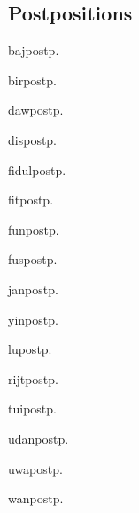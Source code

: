 \begin{multicols*}{2}
\section{Postpositions}

\begin{description}[leftmargin=*]
    \begin{dictentry}{baj}{postp.}
    \end{dictentry}
    \begin{dictentry}{bir}{postp.}
    \end{dictentry}
    \begin{dictentry}{daw}{postp.}
    \end{dictentry}
    \begin{dictentry}{dis}{postp.}
    \end{dictentry}
    \begin{dictentry}{fidul}{postp.}
    \end{dictentry}
    \begin{dictentry}{fit}{postp.}
    \end{dictentry}
    \begin{dictentry}{fun}{postp.}
    \end{dictentry}
    \begin{dictentry}{fus}{postp.}
    \end{dictentry}
    \begin{dictentry}{jan}{postp.}
    \end{dictentry}
    \begin{dictentry}{yin}{postp.}
    \end{dictentry}
    \begin{dictentry}{lu}{postp.}
    \end{dictentry}
    \begin{dictentry}{rijt}{postp.}
    \end{dictentry}
    \begin{dictentry}{tui}{postp.}
    \end{dictentry}
    \begin{dictentry}{udan}{postp.}
    \end{dictentry}
    \begin{dictentry}{uwa}{postp.}
    \end{dictentry}
    \begin{dictentry}{wan}{postp.}
    \end{dictentry}
\end{description}


\end{multicols*}
